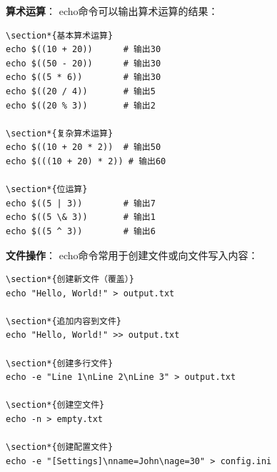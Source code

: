 \documentclass[12pt,UTF8]{ctexbook}
\begin{document}
\textbf{算术运算}：
echo命令可以输出算术运算的结果：

\begin{verbatim}
\section*{基本算术运算}
echo $((10 + 20))      # 输出30
echo $((50 - 20))      # 输出30
echo $((5 * 6))        # 输出30
echo $((20 / 4))       # 输出5
echo $((20 % 3))       # 输出2

\section*{复杂算术运算}
echo $((10 + 20 * 2))  # 输出50
echo $(((10 + 20) * 2)) # 输出60

\section*{位运算}
echo $((5 | 3))        # 输出7
echo $((5 \& 3))       # 输出1
echo $((5 ^ 3))        # 输出6
\end{verbatim}

\textbf{文件操作}：
echo命令常用于创建文件或向文件写入内容：

\begin{verbatim}
\section*{创建新文件（覆盖）}
echo "Hello, World!" > output.txt

\section*{追加内容到文件}
echo "Hello, World!" >> output.txt

\section*{创建多行文件}
echo -e "Line 1\nLine 2\nLine 3" > output.txt

\section*{创建空文件}
echo -n > empty.txt

\section*{创建配置文件}
echo -e "[Settings]\nname=John\nage=30" > config.ini
\end{verbatim}
\end{document}
